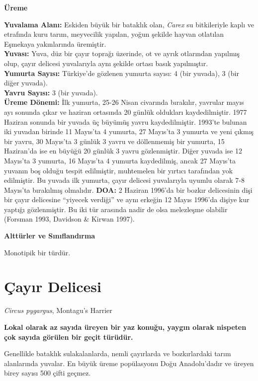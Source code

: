 \documentclass[
  letterpaper,
  DIV=11,
  numbers=noendperiod]{scrreprt}
\begin{document}
\textbf{Üreme}

\textbf{Yuvalama Alanı:} Eskiden büyük bir bataklık olan, \emph{Carex}
su bitkileriyle kaplı ve etrafında kuru tarım, meyvecilik yapılan, yoğun
şekilde hayvan otlatılan Eşmekaya yakınlarında üremiştir.\\
\textbf{Yuvası:} Yuva, düz bir çayır toprağı üzerinde, ot ve ayrık
otlarından yapılmış olup, çayır delicesi yuvalarıyla aynı şekilde ortası
basık yapılmıştır.\\
\textbf{Yumurta Sayısı:} Türkiye'de gözlenen yumurta sayısı: 4 (bir
yuvada), 3 (bir diğer yuvada).\\
\textbf{Yavru Sayısı:} 3 (bir yuvada).\\
\textbf{Üreme Dönemi:} İlk yumurta, 25-26 Nisan civarında bırakılır,
yavrular mayıs ayı sonunda çıkar ve haziran ortasında 20 günlük
oldukları kaydedilmiştir. 1977 Haziran sonunda bir yuvada üç büyümüş
yavru kaydedilmiştir. 1993'te bulunan iki yuvadan birinde 11 Mayıs'ta 4
yumurta, 27 Mayıs'ta 3 yumurta ve yeni çıkmış bir yavru, 30 Mayıs'ta 3
günlük 3 yavru ve döllenmemiş bir yumurta, 15 Haziran'da ise en büyüğü
20 günlük 3 yavru gözlenmiştir. Diğer yuvada ise 12 Mayıs'ta 3 yumurta,
16 Mayıs'ta 4 yumurta kaydedilmiş, ancak 27 Mayıs'ta yuvanın boş olduğu
tespit edilmiştir, muhtemelen bir yırtıcı tarafından yok edilmiştir. Bu
yuvada ilk yumurta, çayır delicesi yuvalarıyla uyumlu olarak 7-8
Mayıs'ta bırakılmış olmalıdır. \textbf{DOA:} 2 Haziran 1996'da bir
bozkır delicesinin dişi bir çayır delicesine ``yiyecek verdiği'' ve aynı
erkeğin 12 Mayıs 1996'da dişiye kur yaptığı gözlenmiştir. Bu iki tür
arasında nadir de olsa melezleşme olabilir (Forsman 1993, Davidson \&
Kirwan 1997).

\textbf{Alttürler ve Sınıflandırma}

Monotipik bir türdür.

\section{Çayır Delicesi}\label{uxe7ayux131r-delicesi}

\emph{Circus pygargus}, Montagu's Harrier

\textbf{Lokal olarak az sayıda üreyen bir yaz konuğu, yaygın olarak
nispeten çok sayıda görülen bir geçit türüdür.}

Genellikle bataklık sulakalanlarda, nemli çayırlarda ve bozkırlardaki
tarım alanlarında yuvalar. En büyük üreme popülasyonu Doğu Anadolu'dadır
ve üreyen birey sayısı 500 çifti geçmez.
\end{document}
